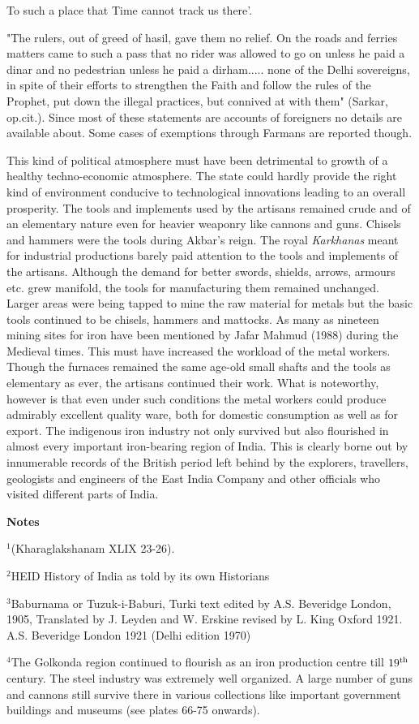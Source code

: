 To such a place that Time cannot track us there’.

"The rulers, out of greed of hasil, gave them no relief.  On the roads and ferries matters came to such a pass that no rider was allowed to go on unless he paid a dinar and no pedestrian unless he paid a dirham..... none of the Delhi sovereigns, in spite of their efforts to strengthen the Faith and follow the rules of the Prophet, put down the illegal practices, but connived at with them" (Sarkar, op.cit.).  Since most of these statements are accounts of foreigners no details are available about. Some cases of exemptions through Farmans are reported though. 

This kind of political atmosphere must have been detrimental to growth of a healthy techno-economic atmosphere. The state could hardly provide the right kind of environment conducive to technological innovations leading to an overall prosperity.  The tools and implements used by the artisans remained crude and of an elementary nature even for heavier weaponry like cannons and guns. Chisels and hammers were the tools during Akbar’s reign.  The royal {\it Karkhanas} meant for industrial productions barely paid attention to the tools and implements of the artisans.  Although the demand for better swords, shields, arrows, armours etc. grew manifold, the tools for manufacturing them remained unchanged.  Larger areas were being tapped to mine the raw material for metals but the basic tools continued to be chisels, hammers and mattocks.  As many as nineteen mining sites for iron have been mentioned by Jafar Mahmud (1988) during the Medieval times.  This must have increased the workload of the metal workers.  Though the furnaces remained the same age-old small shafts and the tools as elementary as ever, the artisans continued their work. What is noteworthy, however is that even under such conditions the metal workers could produce admirably excellent quality ware, both for domestic consumption as well as for export. The indigenous iron industry not only survived but also flourished in almost every important iron-bearing region of India. This is clearly borne out by innumerable records of the British period left behind by the explorers, travellers, geologists and engineers of the East India Company and other officials who visited different parts of India.

\noindent \textbf{\large Notes}

${}^1$(Kharaglakshanam XLIX 23-26).

${}^2$HEID History of India as told by its own Historians

${}^3$Baburnama or Tuzuk-i-Baburi, Turki text edited by A.S. Beveridge London, 1905, Translated by J. Leyden and W. Erskine revised by L. King Oxford 1921. A.S. Beveridge London 1921 (Delhi edition 1970)

${}^4$The Golkonda region continued to flourish as an iron production centre till $19^{\rm th}$ century. The steel industry was extremely well organized. A large number of guns and cannons still survive there in various collections like important government   buildings and museums   (see plates 66-75 onwards).

 
